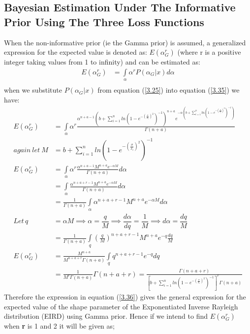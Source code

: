 \documentclass[a4paper,12pt]{report}
\begin{document}
\subsection{Bayesian Estimation Under The Informative Prior Using The Three Loss Functions}
When the non-informative prior (ie the Gamma prior) is assumed, a generalized expression for the expected value is denoted as: $E(\alpha_G^r)$ (where r is a positive integer taking values from 1 to infinity) and can be estimated as:
\begin{equation}\label{3.35}
\begin{split}
E(\alpha_G^r)&=\int\limits_{\alpha}\alpha^r P(\alpha_G|x) d\alpha\\
\end{split}
\end{equation}
when we substitute $P(\alpha_G|x)$ from equation (\ref{3.25}) into equation (\ref{3.35}) we have:
\begin{equation}\label{3.36}
\begin{split}
E(\alpha_G^r)&=\int\limits_{\alpha}\alpha^r \frac{\alpha^{n+a-1}\left(b+\sum\limits_{ i=1 }^{n}ln\left(1-e^{-\left(\frac{\sigma}{x_i}\right)^2}\right)^{-1}\right)^{n+a}e^{-\alpha\left(b+\sum\limits_{ i=1 }^{n}ln\left(1-e^{-\left(\frac{\sigma}{x_i}\right)^2}\right)^{-1}\right)}} {\Gamma(n+a)}\\
again\ let\ M&=b+\sum\limits_{ i=1 }^{n}ln\left(1-e^{-\left(\frac{\sigma}{x_i}\right)^2}\right)^{-1}\\
E(\alpha_G^r)&=\int\limits_{\alpha}\alpha^r \frac{\alpha^{n+a-1}M^{n+a} e^{-\alpha M}}{\Gamma(n+a)} d\alpha \\
&=\int\limits_{\alpha}\frac{\alpha^{n+a+r-1}M^{n+a} e^{-\alpha M}}{\Gamma(n+a)} d\alpha\\
&=\frac{1}{\Gamma(n+a)}\int\limits_{\alpha}\alpha^{n+a+r-1}M^{n+a} e^{-\alpha M}d\alpha\\
Let\,q&=\alpha M\implies\alpha=\dfrac{q}{M}\implies\dfrac{d\alpha}{dq}=\dfrac{1}{M}\implies d\alpha=\dfrac{dq}{M}\\
&=\frac{1}{\Gamma(n+a)}\int\limits_{q}\left(\frac{q}{M}\right)^{n+a+r-1}M^{n+a} e^{-q}\frac{dq}{M}\\
E(\alpha_G^r)&=\frac{M^{n+a}}{M^{n+a+r}\Gamma(n+a)}\int\limits_{q}q^{n+a+r-1}e^{-q}dq\\
&=\frac{1}{M^r\Gamma(n+a)}\Gamma(n+a+r)=\frac{\Gamma(n+a+r)}{\left[b+\sum\limits_{ i=1 }^{n}ln\left(1-e^{-\left(\frac{\sigma}{x_i}\right)^2}\right)^{-1}\right]^r\Gamma(n+a)}
\end{split}
\end{equation}
Therefore the expression in equation (\ref{3.36}) gives the general expression for the expected value of the shape parameter of the Exponentiated Inverse Rayleigh distribution (EIRD) using Gamma prior. Hence if we intend to find $E(\alpha_G^r)$ when \textbf{r} is 1 and 2 it will be given as;
\end{document}
